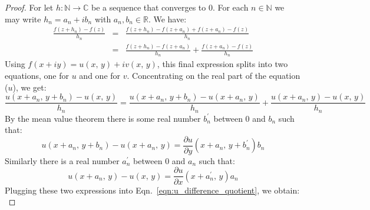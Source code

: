 \documentclass{article}
\theoremstyle{definition}
\begin{document}
        \begin{proof}
            For let $h:\mathbb{N}\rightarrow\mathbb{C}$ be a sequence
            that converges to $0$. For each $n\in\mathbb{N}$
            we may write $h_{n}=a_{n}+ib_{n}$ with $a_{n},b_{n}\in\mathbb{R}$.
            We have:
            \begin{equation}
                \begin{array}{rcl}
                    \displaystyle
                    \frac{f(z+h_{n})-f(z)}{h_{n}}
                    &=&
                    \displaystyle
                    \frac{f(z+h_{n})-f(z+a_{n})+f(z+a_{n})-f(z)}{h_{n}}\\[1.5em]
                    &=&
                    \displaystyle
                    \frac{f(z+h_{n})-f(z+a_{n})}{h_{n}}
                        +\frac{f(z+a_{n})-f(z)}{h_{n}}
                \end{array}
            \end{equation}
            Using $f(x+iy)=u(x,\,y)+iv(x,\,y)$, this final expression splits
            into two equations, one for $u$ and one for $v$. Concentrating
            on the real part of the equation ($u$), we get:
            \begin{equation}
                \label{eqn:u_difference_quotient}
                \frac{u(x+a_{n},\,y+b_{n})-u(x,\,y)}{h_{n}}
                =
                \frac{u(x+a_{n},\,y+b_{n})-u(x+a_{n},\,y)}{h_{n}}
                    +\frac{u(x+a_{n},\,y)-u(x,\,y)}{h_{n}}
            \end{equation}
            By the mean value theorem there is some real number
            ${b}_{n}^{\prime}$ between $0$ and $b_{n}$ such that:
            \begin{equation}
                u(x+a_{n},\,y+b_{n})-u(x+a_{n},\,y)
                =\frac{\partial{u}}{\partial{y}}
                \left(x+a_{n},\,y+b_{n}^{\prime}\right)b_{n}
            \end{equation}
            Similarly there is a real number $a_{n}^{\prime}$ between $0$ and
            $a_{n}$ such that:
            \begin{equation}
                u(x+a_{n},\,y)-u(x,\,y)
                =\frac{\partial{u}}{\partial{x}}
                \left(x+a_{n}^{\prime},\,y\right)a_{n}
            \end{equation}
            Plugging these two expressions into
            Eqn.~\ref{eqn:u_difference_quotient}, we obtain:
            \begin{equation}

\end{equation}
\end{proof}
\end{document}
